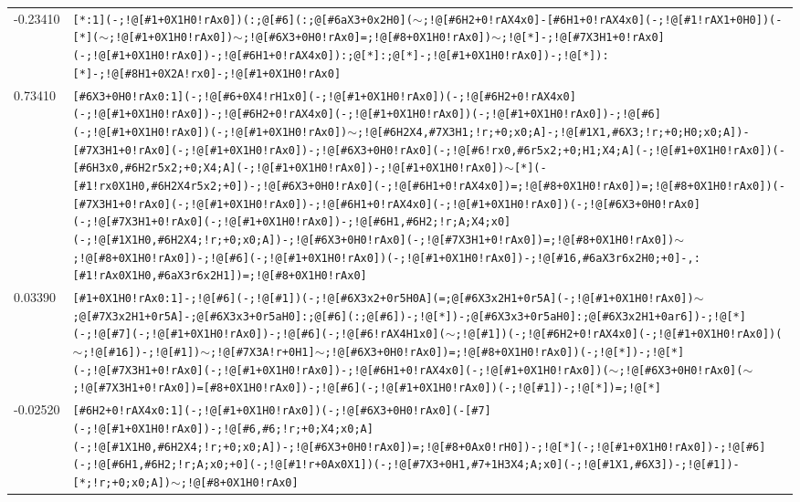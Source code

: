 \begin{longtable}{>{\baselineskip=10pt}p{} >{\baselineskip=10pt}p{}}
-0.23410 & \texttt{[*:1](-;!@[\#1+0X1H0!rAx0])(:;@[\#6](:;@[\#6aX3+0x2H0]($\sim$;!@[\#6H2+0!rAX4x0]-[\#6H1+0!rAX4x0](-;!@[\#1!rAX1+0H0])(-[*]($\sim$;!@[\#1+0X1H0!rAx0])$\sim$;!@[\#6X3+0H0!rAx0]=;!@[\#8+0X1H0!rAx0])$\sim$;!@[*]-;!@[\#7X3H1+0!rAx0](-;!@[\#1+0X1H0!rAx0])-;!@[\#6H1+0!rAX4x0]):;@[*]:;@[*]-;!@[\#1+0X1H0!rAx0])-;!@[*]):[*]-;!@[\#8H1+0X2A!rx0]-;!@[\#1+0X1H0!rAx0]} \\ 
0.73410 & \texttt{[\#6X3+0H0!rAx0:1](-;!@[\#6+0X4!rH1x0](-;!@[\#1+0X1H0!rAx0])(-;!@[\#6H2+0!rAX4x0](-;!@[\#1+0X1H0!rAx0])-;!@[\#6H2+0!rAX4x0](-;!@[\#1+0X1H0!rAx0])(-;!@[\#1+0X1H0!rAx0])-;!@[\#6](-;!@[\#1+0X1H0!rAx0])(-;!@[\#1+0X1H0!rAx0])$\sim$;!@[\#6H2X4,\#7X3H1;!r;+0;x0;A]-;!@[\#1X1,\#6X3;!r;+0;H0;x0;A])-[\#7X3H1+0!rAx0](-;!@[\#1+0X1H0!rAx0])-;!@[\#6X3+0H0!rAx0](-;!@[\#6!rx0,\#6r5x2;+0;H1;X4;A](-;!@[\#1+0X1H0!rAx0])(-[\#6H3x0,\#6H2r5x2;+0;X4;A](-;!@[\#1+0X1H0!rAx0])-;!@[\#1+0X1H0!rAx0])$\sim$[*](-[\#1!rx0X1H0,\#6H2X4r5x2;+0])-;!@[\#6X3+0H0!rAx0](-;!@[\#6H1+0!rAX4x0])=;!@[\#8+0X1H0!rAx0])=;!@[\#8+0X1H0!rAx0])(-[\#7X3H1+0!rAx0](-;!@[\#1+0X1H0!rAx0])-;!@[\#6H1+0!rAX4x0](-;!@[\#1+0X1H0!rAx0])(-;!@[\#6X3+0H0!rAx0](-;!@[\#7X3H1+0!rAx0](-;!@[\#1+0X1H0!rAx0])-;!@[\#6H1,\#6H2;!r;A;X4;x0](-;!@[\#1X1H0,\#6H2X4;!r;+0;x0;A])-;!@[\#6X3+0H0!rAx0](-;!@[\#7X3H1+0!rAx0])=;!@[\#8+0X1H0!rAx0])$\sim$;!@[\#8+0X1H0!rAx0])-;!@[\#6](-;!@[\#1+0X1H0!rAx0])(-;!@[\#1+0X1H0!rAx0])-;!@[\#16,\#6aX3r6x2H0;+0]-,:[\#1!rAx0X1H0,\#6aX3r6x2H1])=;!@[\#8+0X1H0!rAx0]} \\ 
0.03390 & \texttt{[\#1+0X1H0!rAx0:1]-;!@[\#6](-;!@[\#1])(-;!@[\#6X3x2+0r5H0A](=;@[\#6X3x2H1+0r5A](-;!@[\#1+0X1H0!rAx0])$\sim$;@[\#7X3x2H1+0r5A]-;@[\#6X3x3+0r5aH0]:;@[\#6](:;@[\#6])-;!@[*])-;@[\#6X3x3+0r5aH0]:;@[\#6X3x2H1+0ar6])-;!@[*](-;!@[\#7](-;!@[\#1+0X1H0!rAx0])-;!@[\#6](-;!@[\#6!rAX4H1x0]($\sim$;!@[\#1])(-;!@[\#6H2+0!rAX4x0](-;!@[\#1+0X1H0!rAx0])($\sim$;!@[\#16])-;!@[\#1])$\sim$;!@[\#7X3A!r+0H1]$\sim$;!@[\#6X3+0H0!rAx0])=;!@[\#8+0X1H0!rAx0])(-;!@[*])-;!@[*](-;!@[\#7X3H1+0!rAx0](-;!@[\#1+0X1H0!rAx0])-;!@[\#6H1+0!rAX4x0](-;!@[\#1+0X1H0!rAx0])($\sim$;!@[\#6X3+0H0!rAx0]($\sim$;!@[\#7X3H1+0!rAx0])=[\#8+0X1H0!rAx0])-;!@[\#6](-;!@[\#1+0X1H0!rAx0])(-;!@[\#1])-;!@[*])=;!@[*]} \\ 
-0.02520 & \texttt{[\#6H2+0!rAX4x0:1](-;!@[\#1+0X1H0!rAx0])(-;!@[\#6X3+0H0!rAx0](-[\#7](-;!@[\#1+0X1H0!rAx0])-;!@[\#6,\#6;!r;+0;X4;x0;A](-;!@[\#1X1H0,\#6H2X4;!r;+0;x0;A])-;!@[\#6X3+0H0!rAx0])=;!@[\#8+0Ax0!rH0])-;!@[*](-;!@[\#1+0X1H0!rAx0])-;!@[\#6](-;!@[\#6H1,\#6H2;!r;A;x0;+0](-;!@[\#1!r+0Ax0X1])(-;!@[\#7X3+0H1,\#7+1H3X4;A;x0](-;!@[\#1X1,\#6X3])-;!@[\#1])-[*;!r;+0;x0;A])$\sim$;!@[\#8+0X1H0!rAx0]} \\ 

\end{longtable}

